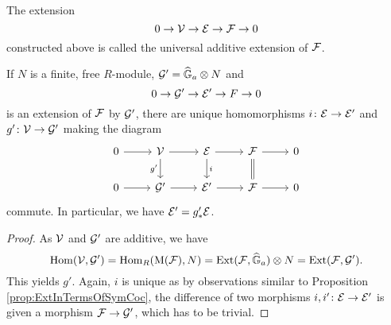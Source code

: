 \documentclass[../main.tex]{subfiles}
\begin{document}
\begin{defi}
  The extension
  \begin{equation*}
    0 \to \mathcal{V} \to \mathcal{E} \to \mathcal{F} \to 0
  \end{equation*}
  constructed above is called the universal additive extension of $\mathcal{F}$.
\end{defi}

\begin{prop}
  If $N$ is a finite, free $R$-module, $\mathcal{G}' = \widehat{\mathbb{G}}_a \otimes N$ and 
  \begin{equation*}
    0 \to \mathcal{G}' \to \mathcal{E}' \to F \to 0
  \end{equation*}
  is an extension of $\mathcal{F}$ by $\mathcal{G}'$, there are unique homomorphisms
    $i\colon  \mathcal{E} \to \mathcal{E}'$ and $g'\colon  \mathcal{V} \to \mathcal{G}'$ making the diagram
  \begin{equation*}
\begin{tikzcd}[ampersand replacement=\&]
	0 \& {\cV} \& \cE \& \cF \& 0 \\
	0 \& {\cG'} \& {\cE'} \& \cF \& 0
	\arrow[from=1-1, to=1-2]
	\arrow[from=1-2, to=1-3]
	\arrow["{g'}"', from=1-2, to=2-2]
	\arrow[from=1-3, to=1-4]
	\arrow["i", from=1-3, to=2-3]
	\arrow[from=1-4, to=1-5]
	\arrow[Rightarrow, no head, from=1-4, to=2-4]
	\arrow[from=2-1, to=2-2]
	\arrow[from=2-2, to=2-3]
	\arrow[from=2-3, to=2-4]
	\arrow[from=2-4, to=2-5]
\end{tikzcd}
  \end{equation*}
  commute. In particular, we have $\mathcal{E}' = g'_* \mathcal{E}$. 
\begin{proof}
  As $\mathcal{V}$ and $\mathcal{G}'$ are additive, we have
  \begin{equation*}
    \operatorname{Hom}(\mathcal{V}, \mathcal{G}') = \operatorname{Hom}_R(\mathrm M(\mathcal{F}), N) = \operatorname{Ext}(\mathcal{F}, \widehat{\mathbb{G}}_a) \otimes N =
    \operatorname{Ext}(\mathcal{F}, \mathcal{G}').
  \end{equation*}
  This yields $g'$. Again, $i$ is unique as by observations similar to 
  Proposition \ref{prop:ExtInTermsOfSymCoc}, the difference of two
  morphisms $i,i'\colon \mathcal{E} \to \mathcal{E}'$ is given a morphism $\mathcal{F} \to \mathcal{G}'$, which has
  to be trivial.
\end{proof}
\end{prop}
\end{document}
